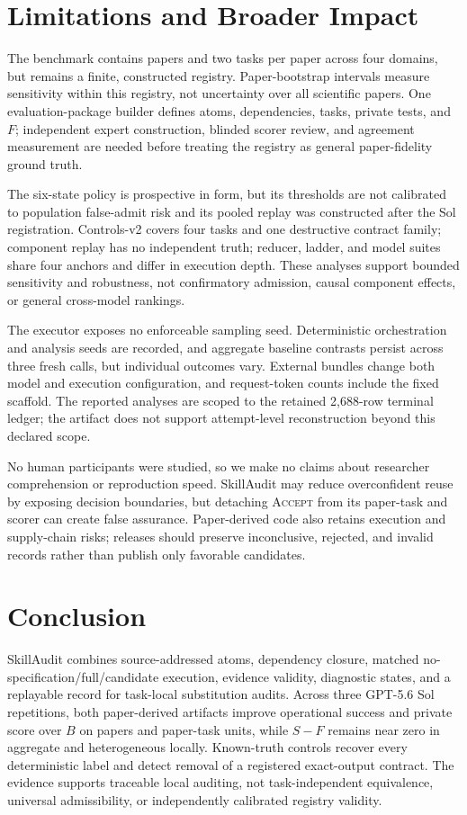 \section{Limitations and Broader Impact}
\label{sec:limitations}

The benchmark contains \PrimaryPapers{} papers and two tasks per paper across four domains, but remains a finite, constructed registry. Paper-bootstrap intervals measure sensitivity within this registry, not uncertainty over all scientific papers. One evaluation-package builder defines atoms, dependencies, tasks, private tests, and $F$; independent expert construction, blinded scorer review, and agreement measurement are needed before treating the registry as general paper-fidelity ground truth.

The six-state policy is prospective in form, but its thresholds are not calibrated to population false-admit risk and its pooled replay was constructed after the Sol registration. Controls-v2 covers four tasks and one destructive contract family; component replay has no independent truth; reducer, ladder, and model suites share four anchors and differ in execution depth. These analyses support bounded sensitivity and robustness, not confirmatory admission, causal component effects, or general cross-model rankings.

The executor exposes no enforceable sampling seed. Deterministic orchestration and analysis seeds are recorded, and aggregate baseline contrasts persist across three fresh calls, but individual outcomes vary. External bundles change both model and execution configuration, and request-token counts include the fixed scaffold. The reported analyses are scoped to the retained 2,688-row terminal ledger; the artifact does not support attempt-level reconstruction beyond this declared scope.

No human participants were studied, so we make no claims about researcher comprehension or reproduction speed. SkillAudit may reduce overconfident reuse by exposing decision boundaries, but detaching \textsc{Accept} from its paper-task and scorer can create false assurance. Paper-derived code also retains execution and supply-chain risks; releases should preserve inconclusive, rejected, and invalid records rather than publish only favorable candidates.

\section{Conclusion}

SkillAudit combines source-addressed atoms, dependency closure, matched no-specification/full/candidate execution, evidence validity, diagnostic states, and a replayable record for task-local substitution audits. Across three GPT-5.6 Sol repetitions, both paper-derived artifacts improve operational success and private score over $B$ on \PrimaryPapers{} papers and \PrimaryTasks{} paper-task units, while $S-F$ remains near zero in aggregate and heterogeneous locally. Known-truth controls recover every deterministic label and detect removal of a registered exact-output contract. The evidence supports traceable local auditing, not task-independent equivalence, universal admissibility, or independently calibrated registry validity.
